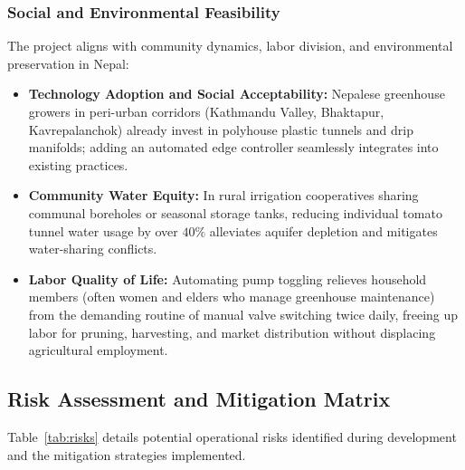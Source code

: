 \documentclass[12pt, a4paper]{article}
\begin{document}
\subsubsection{Social and Environmental Feasibility}
The project aligns with community dynamics, labor division, and environmental preservation in Nepal:
\begin{itemize}[noitemsep]
    \item \textbf{Technology Adoption and Social Acceptability:} Nepalese greenhouse growers in peri-urban corridors (Kathmandu Valley, Bhaktapur, Kavrepalanchok) already invest in polyhouse plastic tunnels and drip manifolds; adding an automated edge controller seamlessly integrates into existing practices.
    \item \textbf{Community Water Equity:} In rural irrigation cooperatives sharing communal boreholes or seasonal storage tanks, reducing individual tomato tunnel water usage by over $40\%$ alleviates aquifer depletion and mitigates water-sharing conflicts.
    \item \textbf{Labor Quality of Life:} Automating pump toggling relieves household members (often women and elders who manage greenhouse maintenance) from the demanding routine of manual valve switching twice daily, freeing up labor for pruning, harvesting, and market distribution without displacing agricultural employment.
\end{itemize}

\subsection{Risk Assessment and Mitigation Matrix}
\label{app:risk}

Table~\ref{tab:risks} details potential operational risks identified during development and the mitigation strategies implemented.
\end{document}
